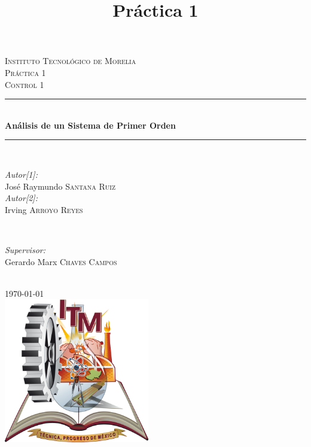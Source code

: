 \documentclass[12pt]{article}
\begin{document}
\begin{titlepage}

\newcommand{\HRule}{\rule{\linewidth}{0.5mm}} 
\center 
 

\title{Práctica 1}
\textsc{\LARGE Instituto Tecnológico de Morelia}\\[1.1cm]
\textsc{\Large Práctica 1}\\[0.3cm]
\textsc{\large Control 1}\\[0.3cm] 

\HRule \\[0.4cm]
{ \huge \bfseries Análisis de un Sistema de Primer Orden}\\[0.2cm] 
\HRule \\[1cm]

\begin{minipage}{0.5\textwidth}
\begin{flushleft} \large
\emph{Autor[1]:}\\
José Raymundo \textsc{Santana Ruiz} \\
\emph{Autor[2]:}\\
Irving \textsc{Arroyo Reyes}
\end{flushleft}
\end{minipage}
~
\begin{minipage}{0.4\textwidth}
\begin{flushright} \large
\emph{Supervisor:} \\
Gerardo Marx \textsc{Chaves Campos} 
\end{flushright}
\end{minipage}\\[1cm]
{\large \today}\\[1cm]
\includegraphics[width=2.5in]{Itmorelia.png}\\[1cm] 
\vfill %
\end{titlepage}
\end{document}
